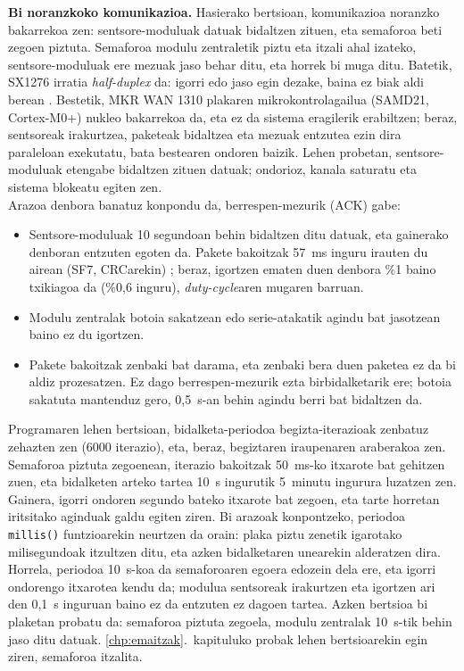 \documentclass[10pt]{article}
\newcommand{\acpar}[1]{(\acs{#1})\acused{#1}}
\begin{document}
\textbf{Bi noranzkoko komunikazioa.} Hasierako bertsioan, komunikazioa noranzko bakarrekoa zen: sentsore-moduluak datuak bidaltzen zituen, eta semaforoa beti zegoen piztuta. Semaforoa modulu zentraletik piztu eta itzali ahal izateko, sentsore-moduluak ere mezuak jaso behar ditu, eta horrek bi muga ditu. Batetik, SX1276 irratia \textit{half-duplex} da: igorri edo jaso egin dezake, baina ez biak aldi berean \cite{sx1276datasheet}. Bestetik, MKR WAN 1310 plakaren mikrokontrolagailua (SAMD21, Cortex-M0+) nukleo bakarrekoa da, eta ez da sistema eragilerik erabiltzen; beraz, sentsoreak irakurtzea, paketeak bidaltzea eta mezuak entzutea ezin dira paraleloan exekutatu, bata bestearen ondoren baizik. Lehen probetan, sentsore-moduluak etengabe bidaltzen zituen datuak; ondorioz, kanala saturatu eta sistema blokeatu egiten zen.\\

Arazoa denbora banatuz konpondu da, berrespen-mezurik \acpar{ACK} gabe:
\begin{itemize}
    \item Sentsore-moduluak 10 segundoan behin bidaltzen ditu datuak, eta gainerako denboran entzuten egoten da. Pakete bakoitzak 57~ms inguru irauten du airean (SF7, CRCarekin) \cite{an1200_13}; beraz, igortzen ematen duen denbora \%1 baino txikiagoa da (\%0,6 inguru), \textit{duty-cycle}aren mugaren barruan.
    \item Modulu zentralak botoia sakatzean edo serie-atakatik agindu bat jasotzean baino ez du igortzen.
    \item Pakete bakoitzak zenbaki bat darama, eta zenbaki bera duen paketea ez da bi aldiz prozesatzen. Ez dago berrespen-mezurik ezta birbidalketarik ere; botoia sakatuta mantenduz gero, 0,5~s-an behin agindu berri bat bidaltzen da.
\end{itemize}

Programaren lehen bertsioan, bidalketa-periodoa begizta-iterazioak zenbatuz zehazten zen (6000 iterazio), eta, beraz, begiztaren iraupenaren araberakoa zen. Semaforoa piztuta zegoenean, iterazio bakoitzak 50~ms-ko itxarote bat gehitzen zuen, eta bidalketen arteko tartea 10~s ingurutik 5~minutu ingurura luzatzen zen. Gainera, igorri ondoren segundo bateko itxarote bat zegoen, eta tarte horretan iritsitako aginduak galdu egiten ziren. Bi arazoak konpontzeko, periodoa \texttt{millis()} funtzioarekin neurtzen da orain: plaka piztu zenetik igarotako milisegundoak itzultzen ditu, eta azken bidalketaren unearekin alderatzen dira. Horrela, periodoa 10~s-koa da semaforoaren egoera edozein dela ere, eta igorri ondorengo itxarotea kendu da; modulua sentsoreak irakurtzen eta igortzen ari den 0,1~s inguruan baino ez da entzuten ez dagoen tartea. Azken bertsioa bi plaketan probatu da: semaforoa piztuta zegoela, modulu zentralak 10~s-tik behin jaso ditu datuak. \ref{chp:emaitzak}.~kapituluko probak lehen bertsioarekin egin ziren, semaforoa itzalita.\\
\end{document}
